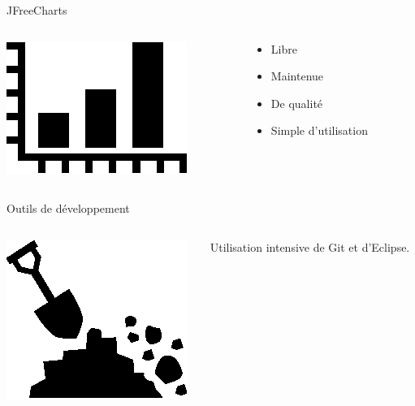 \documentclass[xcolor=x11names,12pt,compress]{beamer}
\begin{document}
\begin{frame}{JFreeCharts}
    \begin{columns}
        \begin{column}{0.2\textwidth}
        \includegraphics{graph.eps}
    \end{column}
    \begin{column}{0.5\textwidth}
            \begin{itemize}
	            \item Libre
	            \item Maintenue
	            \item De qualité
	            \item Simple d'utilisation
            \end{itemize}
    \end{column}
\end{columns}
\end{frame}

\begin{frame}{Outils de développement}
    \begin{columns}
        \begin{column}{0.2\textwidth}
        \includegraphics{tools.eps}
    \end{column}
    \begin{column}{0.5\textwidth}
        \large Utilisation intensive de Git et d'Eclipse.
    \end{column}
\end{columns}
\end{frame}
\end{document}
